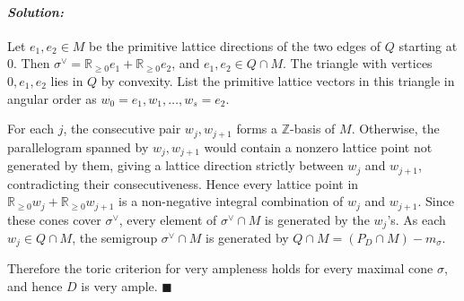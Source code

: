 \documentclass[12pt, a4paper]{article}
\newenvironment{solution}
  {\paragraph{\textit{Solution:}}\par\medskip}
  {\hfill$\blacksquare$\vspace{0.1cm}}
\begin{document}
\begin{solution}
Let \(e_1,e_2\in M\) be the primitive lattice directions of the two
edges of \(Q\) starting at \(0\).  Then
\(\sigma^\vee=\mathbb R_{\ge 0}e_1+\mathbb R_{\ge 0}e_2\), and
\(e_1,e_2\in Q\cap M\).  The triangle with vertices \(0,e_1,e_2\) lies
in \(Q\) by convexity.  List the primitive lattice vectors in this
triangle in angular order as \(w_0=e_1,w_1,\dots,w_s=e_2\).

For each \(j\), the consecutive pair \(w_j,w_{j+1}\) forms a
\(\mathbb Z\)-basis of \(M\).  Otherwise, the parallelogram spanned by
\(w_j,w_{j+1}\) would contain a nonzero lattice point not generated by
them, giving a lattice direction strictly between \(w_j\) and
\(w_{j+1}\), contradicting their consecutiveness.  Hence every lattice
point in \(\mathbb R_{\ge0}w_j+\mathbb R_{\ge0}w_{j+1}\) is a
non-negative integral combination of \(w_j\) and \(w_{j+1}\).  Since
these cones cover \(\sigma^\vee\), every element of \(\sigma^\vee\cap M\)
is generated by the \(w_j\)'s.  As each \(w_j\in Q\cap M\), the semigroup
\(\sigma^\vee\cap M\) is generated by \(Q\cap M=(P_D\cap M)-m_\sigma\).

Therefore the toric criterion for very ampleness holds for every
maximal cone \(\sigma\), and hence \(D\) is very ample.
\end{solution}
\end{document}
